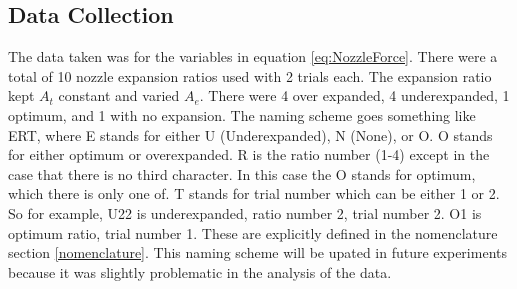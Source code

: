 \subsection{Data Collection}
The data taken was for the variables in equation \ref{eq:NozzleForce}. There were a total of 10 nozzle expansion ratios used with 2 trials each. The expansion ratio kept $A_t$ constant and varied $A_e$. There were 4 over expanded, 4 underexpanded, 1 optimum, and 1 with no expansion. The naming scheme goes something like ERT, where E stands for either U (Underexpanded), N (None), or O. O stands for either optimum or overexpanded. R is the ratio number (1-4) except in the case that there is no third character. In this case the O stands for optimum, which there is only one of. T stands for trial number which can be either 1 or 2. So for example, U22 is underexpanded, ratio number 2, trial number 2. O1 is optimum ratio, trial number 1. These are explicitly defined in the nomenclature section \ref{nomenclature}.%
%
%
%
%
%
%
%
%
%
%
%
%
%
%
%
%
%
%
%
This naming scheme will be upated in future experiments because it was slightly problematic in the analysis of the data.
